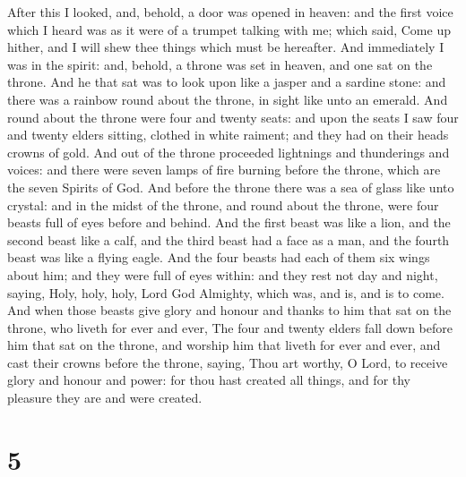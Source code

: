  After this I looked, and, behold, a door was opened in
heaven: and the first voice which I heard was as it were of a trumpet
talking with me; which said, Come up hither, and I will shew thee things
which must be hereafter.  And immediately I was in the
spirit: and, behold, a throne was set in heaven, and one sat on the
throne.  And he that sat was to look upon like a jasper
and a sardine stone: and there was a rainbow round about the throne, in
sight like unto an emerald.  And round about the throne
were four and twenty seats: and upon the seats I saw four and twenty
elders sitting, clothed in white raiment; and they had on their heads
crowns of gold.  And out of the throne proceeded
lightnings and thunderings and voices: and there were seven lamps of
fire burning before the throne, which are the seven Spirits of God.
 And before the throne there was a sea of glass like unto
crystal: and in the midst of the throne, and round about the throne,
were four beasts full of eyes before and behind.  And the
first beast was like a lion, and the second beast like a calf, and the
third beast had a face as a man, and the fourth beast was like a flying
eagle.  And the four beasts had each of them six wings
about him; and they were full of eyes within: and they rest not day and
night, saying, Holy, holy, holy, Lord God Almighty, which was, and is,
and is to come.  And when those beasts give glory and
honour and thanks to him that sat on the throne, who liveth for ever and
ever,  The four and twenty elders fall down before him
that sat on the throne, and worship him that liveth for ever and ever,
and cast their crowns before the throne, saying,  Thou
art worthy, O Lord, to receive glory and honour and power: for thou hast
created all things, and for thy pleasure they are and were created.

\hypertarget{section-4}{%
\section{5}\label{section-4}}

